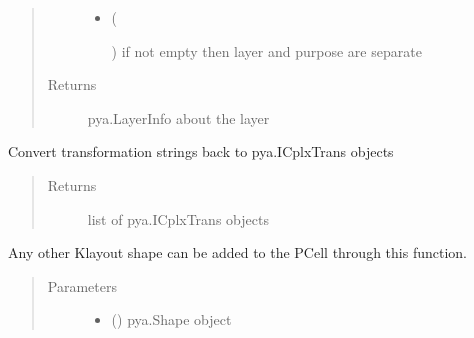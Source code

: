 \documentclass[a4paper,10pt,english]{sphinxmanual}
\begin{document}
\begin{fulllineitems}
\begin{fulllineitems}
\begin{quote}
\begin{description}
\begin{itemize}
\item {} 
 (%
\begin{footnote}[69]\sphinxAtStartFootnote
{}
%
\end{footnote}) \textendash{} if not empty then layer and purpose are separate

\end{itemize}

\item[{Returns}] \leavevmode
pya.LayerInfo about the layer

\end{description}\end{quote}

\end{fulllineitems}


\begin{fulllineitems}
\label{\detokenize{photonics/photonics:kppc.photonics.PhotDevice.get_transformations}}
Convert transformation strings back to pya.ICplxTrans objects
\begin{quote}\begin{description}
\item[{Returns}] \leavevmode
list of pya.ICplxTrans objects

\end{description}\end{quote}

\end{fulllineitems}


\begin{fulllineitems}
\label{\detokenize{photonics/photonics:kppc.photonics.PhotDevice.insert_shape}}
Any other Klayout shape can be added to the PCell through this function.
\begin{quote}\begin{description}
\item[{Parameters}] \leavevmode\begin{itemize}
\item {} 
 () \textendash{} pya.Shape object


\end{itemize}
\end{description}
\end{quote}
\end{fulllineitems}
\end{fulllineitems}
\end{document}

